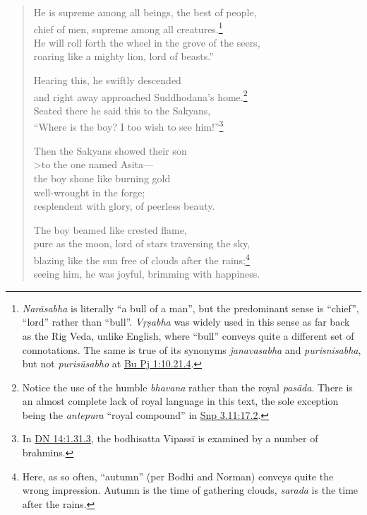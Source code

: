 \documentclass[12pt,openany]{book}%
\begin{document}
\begin{verse}
He is supreme among all beings, the best of people, \\
chief of men, supreme among all creatures.\footnote{\textit{\textsanskrit{Narāsabha}} is literally “a bull of a man”, but the predominant sense is “chief”, “lord” rather than “bull”. \textit{\textsanskrit{Vṛṣabha}} was widely used in this sense as far back as the Rig Veda, unlike English, where “bull” conveys quite a different set of connotations. The same is true of its synonyms \textit{janavasabha} and \textit{purisnisabha}, but not \textit{\textsanskrit{purisūsabho}} at \href{https://suttacentral.net/pli-tv-bu-vb-pj1/en/sujato\#10.21.4}{Bu Pj 1:10.21.4}. } \\
He will roll forth the wheel in the grove of the seers, \\
roaring like a mighty lion, lord of beasts.” 

Hearing this, he swiftly descended \\
and right away approached Suddhodana’s home.\footnote{Notice the use of the humble \textit{bhavana} rather than the royal \textit{\textsanskrit{pasāda}}. There is an almost complete lack of royal language in this text, the sole exception being the \textit{antepura} “royal compound” in \href{https://suttacentral.net/snp3.11/en/sujato\#17.2}{Snp 3.11:17.2}. } \\
Seated there he said this to the Sakyans, \\
“Where is the boy? I too wish to see him!”\footnote{In \href{https://suttacentral.net/dn14/en/sujato\#1.31.3}{DN 14:1.31.3}, the bodhisatta \textsanskrit{Vipassī} is examined by a number of brahmins. } 

Then the Sakyans showed their son \\>to the one named Asita—\\
the boy shone like burning gold \\
well-wrought in the forge; \\
resplendent with glory, of peerless beauty. 

The boy beamed like crested flame, \\
pure as the moon, lord of stars traversing the sky, \\
blazing like the sun free of clouds after the rains;\footnote{Here, as so often, “autumn” (per Bodhi and Norman) conveys quite the wrong impression. Autumn is the time of gathering clouds, \textit{sarada} is the time after the rains. } \\
seeing him, he was joyful, brimming with happiness. 


\end{verse}
\end{document}
